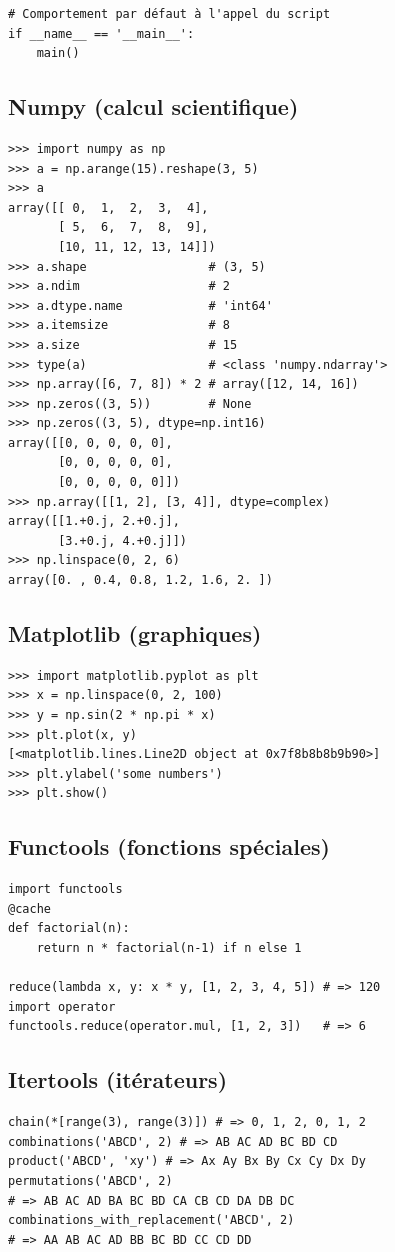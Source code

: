 \documentclass{article}
\begin{document}
\begin{multicols*}{4}
\begin{lstlisting}
# Comportement par défaut à l'appel du script
if __name__ == '__main__':
    main()
\end{lstlisting}

\subsection*{Numpy (calcul scientifique)}
\begin{lstlisting}
>>> import numpy as np
>>> a = np.arange(15).reshape(3, 5)
>>> a
array([[ 0,  1,  2,  3,  4],
       [ 5,  6,  7,  8,  9],
       [10, 11, 12, 13, 14]])
>>> a.shape                 # (3, 5)
>>> a.ndim                  # 2
>>> a.dtype.name            # 'int64'
>>> a.itemsize              # 8
>>> a.size                  # 15
>>> type(a)                 # <class 'numpy.ndarray'>
>>> np.array([6, 7, 8]) * 2 # array([12, 14, 16])
>>> np.zeros((3, 5))        # None
>>> np.zeros((3, 5), dtype=np.int16)
array([[0, 0, 0, 0, 0],
       [0, 0, 0, 0, 0],
       [0, 0, 0, 0, 0]])
>>> np.array([[1, 2], [3, 4]], dtype=complex)
array([[1.+0.j, 2.+0.j],
       [3.+0.j, 4.+0.j]])
>>> np.linspace(0, 2, 6)
array([0. , 0.4, 0.8, 1.2, 1.6, 2. ])\end{lstlisting}

\subsection*{Matplotlib (graphiques)}
\begin{lstlisting}
>>> import matplotlib.pyplot as plt
>>> x = np.linspace(0, 2, 100)
>>> y = np.sin(2 * np.pi * x)
>>> plt.plot(x, y)
[<matplotlib.lines.Line2D object at 0x7f8b8b8b9b90>]
>>> plt.ylabel('some numbers')
>>> plt.show()\end{lstlisting}

\subsection*{Functools (fonctions spéciales)}
\begin{lstlisting}
import functools
@cache
def factorial(n):
    return n * factorial(n-1) if n else 1

reduce(lambda x, y: x * y, [1, 2, 3, 4, 5]) # => 120
import operator
functools.reduce(operator.mul, [1, 2, 3])   # => 6\end{lstlisting}

\subsection*{Itertools (itérateurs)}
\begin{lstlisting}
chain(*[range(3), range(3)]) # => 0, 1, 2, 0, 1, 2
combinations('ABCD', 2) # => AB AC AD BC BD CD
product('ABCD', 'xy') # => Ax Ay Bx By Cx Cy Dx Dy
permutations('ABCD', 2)
# => AB AC AD BA BC BD CA CB CD DA DB DC
combinations_with_replacement('ABCD', 2)
# => AA AB AC AD BB BC BD CC CD DD\end{lstlisting}


\end{multicols*}
\end{document}
